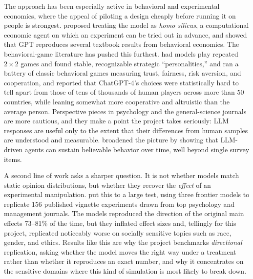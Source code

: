 \documentclass[14pt,a4paper]{extarticle}
\let\cite\squarecite
\begin{document}
The approach has been especially active in behavioral and experimental economics, where the appeal of piloting a design cheaply before running it on people is strongest. \textcite{horton2023} proposed treating the model as \emph{homo silicus}, a computational economic agent on which an experiment can be tried out in advance, and showed that GPT reproduces several textbook results from behavioral economics. The behavioral-game literature has pushed this furthest. \textcite{akata2025} had models play repeated \(2 \times 2\) games and found stable, recognizable strategic ``personalities,'' and \textcite{mei2024} ran a battery of classic behavioral games measuring trust, fairness, risk aversion, and cooperation, and reported that ChatGPT-4's choices were statistically hard to tell apart from those of tens of thousands of human players across more than 50 countries, while leaning somewhat more cooperative and altruistic than the average person. Perspective pieces in psychology and the general-science journals \cite{dillion2023,grossmann2023} are more cautious, and they make a point the project takes seriously: LLM responses are useful only to the extent that their differences from human samples are understood and measurable. \textcite{park2023} broadened the picture by showing that LLM-driven agents can sustain believable behavior over time, well beyond single survey items.

A second line of work asks a sharper question. It is not whether models match static opinion distributions, but whether they recover the \emph{effect} of an experimental manipulation. \textcite{cui2025} put this to a large test, using three frontier models to replicate 156 published vignette experiments drawn from top psychology and management journals. The models reproduced the direction of the original main effects 73--81\% of the time, but they inflated effect sizes and, tellingly for this project, replicated noticeably worse on socially sensitive topics such as race, gender, and ethics. Results like this are why the project benchmarks \emph{directional} replication, asking whether the model moves the right way under a treatment rather than whether it reproduces an exact number, and why it concentrates on the sensitive domains where this kind of simulation is most likely to break down.
\end{document}
